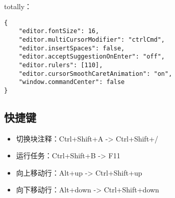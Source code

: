 totally：

\begin{verbatim}
{
    "editor.fontSize": 16,
    "editor.multiCursorModifier": "ctrlCmd",
    "editor.insertSpaces": false,
    "editor.acceptSuggestionOnEnter": "off",
    "editor.rulers": [110],
    "editor.cursorSmoothCaretAnimation": "on",
    "window.commandCenter": false
}
\end{verbatim}

\subsection{快捷键}

\begin{itemize}
    \item 切换块注释：Ctrl+Shift+A -> Ctrl+Shift+/
    \item 运行任务：Ctrl+Shift+B -> F11
    \item 向上移动行：Alt+up -> Ctrl+Shift+up
    \item 向下移动行：Alt+down -> Ctrl+Shift+down
\end{itemize}